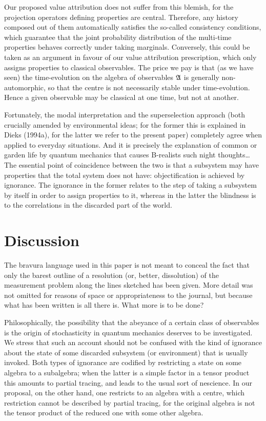 \documentclass[12pt,titlepage]{article}
\newcommand{\A}{\frak A}
\begin{document}
Our proposed value attribution does not suffer from this blemish, for the
projection operators
defining properties are central. Therefore, any history composed out of them
automatically satisfies
the so-called consistency conditions, which guarantee that the joint
probability distribution of the
multi-time properties behaves correctly under taking marginals.
Conversely, this could be taken as an argument in favour of our value
attribution prescription,
which only assigns properties to classical observables.
The price we pay is that (as we have seen) the time-evolution on the algebra of
observables $\A$ is
generally non-automorphic, so that the centre is not necessarily stable under
time-evolution.
Hence a given observable may be classical at one time, but not at another.

Fortunately, the modal interpretation and the superselection approach (both
crucially amended
by environmental ideas; for the former this is explained in Dieks (1994a), for
the latter we refer to
the present paper) completely agree when applied to everyday situations. And it
is precisely the
explanation of common or garden life by quantum mechanics that causes
B-realists such night
thoughts\ldots  The essential point of coincidence between the two is that a
subsystem may have
properties that the total system does not have: objectification is achieved by
ignorance.
The ignorance in the former relates to the step of taking a subsystem by itself
in order to assign
properties to it, whereas in the latter the blindness is to the correlations in
the
discarded part of the world.
\section{Discussion} The bravura language used in this paper is not meant
to conceal the fact that only the barest outline of a resolution (or, better,
dissolution) of the
measurement problem along the lines sketched has been given. More detail was
not omitted for reasons
of space or appropriateness to the journal, but because what has been written
is all there is. What
more is to be done?

Philosophically, the possibility that the abeyance of a certain class of
observables is the origin of
stochasticity in quantum mechanics deserves to be investigated. We stress that
such an account
should not be confused with the  kind of ignorance about the state of some
discarded subsystem (or environment) that is usually invoked.
 Both types of ignorance are codified by restricting a state on some algebra to
a subalgebra; when
the latter is a simple factor in a tensor product this amounts to partial
tracing, and leads to the
usual sort of nescience. In our proposal, on the other hand, one restricts to
an algebra with a
centre, which restriction cannot be described by partial tracing, for the
original algebra is not
the tensor product of the reduced one with some other algebra.
\end{document}
